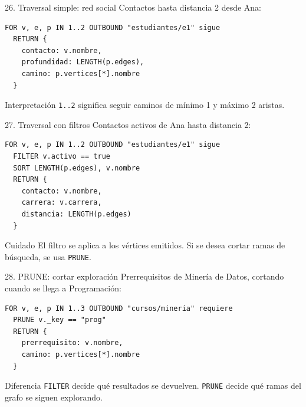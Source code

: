 \documentclass[aspectratio=169,11pt]{beamer}
\begin{document}
\begin{frame}[fragile]{26. Traversal simple: red social}
Contactos hasta distancia 2 desde Ana:

\begin{lstlisting}
FOR v, e, p IN 1..2 OUTBOUND "estudiantes/e1" sigue
  RETURN {
    contacto: v.nombre,
    profundidad: LENGTH(p.edges),
    camino: p.vertices[*].nombre
  }
\end{lstlisting}

\vspace{0.2cm}
\begin{block}{Interpretación}
\texttt{1..2} significa seguir caminos de mínimo 1 y máximo 2 aristas.
\end{block}
\end{frame}

\begin{frame}[fragile]{27. Traversal con filtros}
Contactos activos de Ana hasta distancia 2:

\begin{lstlisting}
FOR v, e, p IN 1..2 OUTBOUND "estudiantes/e1" sigue
  FILTER v.activo == true
  SORT LENGTH(p.edges), v.nombre
  RETURN {
    contacto: v.nombre,
    carrera: v.carrera,
    distancia: LENGTH(p.edges)
  }
\end{lstlisting}

\begin{alertblock}{Cuidado}
El filtro se aplica a los vértices emitidos. Si se desea cortar ramas de búsqueda, se usa \texttt{PRUNE}.
\end{alertblock}
\end{frame}

\begin{frame}[fragile]{28. PRUNE: cortar exploración}
Prerrequisitos de Minería de Datos, cortando cuando se llega a Programación:

\begin{lstlisting}
FOR v, e, p IN 1..3 OUTBOUND "cursos/mineria" requiere
  PRUNE v._key == "prog"
  RETURN {
    prerrequisito: v.nombre,
    camino: p.vertices[*].nombre
  }
\end{lstlisting}

\begin{block}{Diferencia}
\texttt{FILTER} decide qué resultados se devuelven. \texttt{PRUNE} decide qué ramas del grafo se siguen explorando.
\end{block}
\end{frame}
\end{document}
